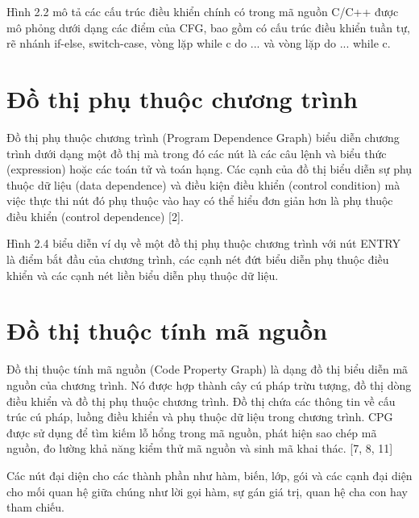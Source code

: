 Hình 2.2 mô tả các cấu trúc điều khiển chính có trong mã nguồn C/C++ được mô phỏng dưới dạng các điểm của CFG, bao gồm có cấu trúc điều khiển tuần tự, rẽ nhánh if-else, switch-case, vòng lặp while c do ... và vòng lặp do ... while c.

\section{Đồ thị phụ thuộc chương trình}

Đồ thị phụ thuộc chương trình (Program Dependence Graph) biểu diễn chương
trình dưới dạng một đồ thị mà trong đó các nút là các câu lệnh và biểu thức (expression)
hoặc các toán tử và toán hạng. Các cạnh của đồ thị biểu diễn sự phụ thuộc dữ liệu (data
dependence) và điều kiện điều khiển (control condition) mà việc thực thi nút đó phụ
thuộc vào hay có thể hiểu đơn giản hơn là phụ thuộc điều khiển (control dependence)
[2].

Hình 2.4 biểu diễn ví dụ về một đồ thị phụ thuộc chương trình với nút ENTRY là
điểm bắt đầu của chương trình, các cạnh nét đứt biểu diễn phụ thuộc điều khiển và các
cạnh nét liền biểu diễn phụ thuộc dữ liệu.

\section{Đồ thị thuộc tính mã nguồn}

Đồ thị thuộc tính mã nguồn (Code Property Graph) là dạng đồ thị biểu diễn mã
nguồn của chương trình. Nó được hợp thành cây cú pháp trừu tượng, đồ thị dòng điều khiển và đồ thị phụ thuộc chương trình. Đồ thị chứa các thông tin về cấu trúc cú pháp,
luồng điều khiển và phụ thuộc dữ liệu trong chương trình. CPG được sử dụng để tìm
kiếm lỗ hổng trong mã nguồn, phát hiện sao chép mã nguồn, đo lường khả năng kiểm
thử mã nguồn và sinh mã khai thác. [7, 8, 11]

Các nút đại diện cho các thành phần như hàm, biến, lớp, gói và các cạnh đại diện
cho mối quan hệ giữa chúng như lời gọi hàm, sự gán giá trị, quan hệ cha con hay tham
chiếu.